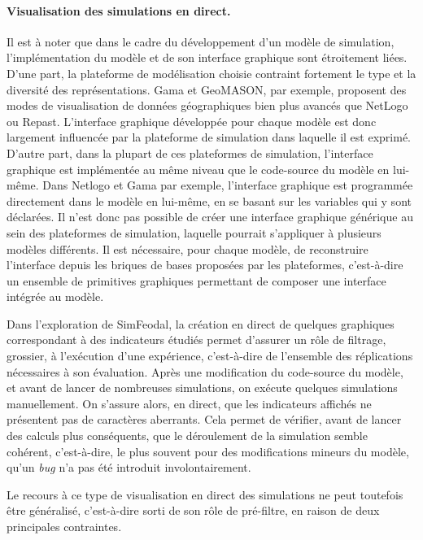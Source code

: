\paragraph{Visualisation des simulations en direct.}

Il est à noter que dans le cadre du développement d'un modèle de simulation, l'implémentation du modèle et de son interface graphique sont étroitement liées.
D'une part, la plateforme de modélisation choisie contraint fortement le type et la diversité des représentations.
Gama et GeoMASON, par exemple, proposent des modes de visualisation de données géographiques bien plus avancés que NetLogo ou Repast.
L'interface graphique développée pour chaque modèle est donc largement influencée par la plateforme de simulation dans laquelle il est exprimé.
D'autre part, dans la plupart de ces plateformes de simulation, l'interface graphique est implémentée au même niveau que le code-source du modèle en lui-même.
Dans Netlogo et Gama par exemple, l'interface graphique est programmée directement dans le modèle en lui-même, en se basant sur les variables qui y sont déclarées.
Il n'est donc pas possible de créer une interface graphique générique au sein des plateformes de simulation, laquelle pourrait s'appliquer à plusieurs modèles différents.
Il est nécessaire, pour chaque modèle, de reconstruire l'interface depuis les briques de bases proposées par les plateformes, c'est-à-dire un ensemble de primitives graphiques permettant de composer une interface intégrée au modèle.

Dans l'exploration de SimFeodal, la création en direct de quelques graphiques correspondant à des indicateurs étudiés permet d'assurer un rôle de filtrage, grossier, à l'exécution d'une expérience, c'est-à-dire de l'ensemble des réplications nécessaires à son évaluation.
Après une modification du code-source du modèle, et avant de lancer de nombreuses simulations, on exécute quelques simulations \og manuellement\fg{}.
On s'assure alors, en direct, que les indicateurs affichés ne présentent pas de caractères aberrants.
Cela permet de vérifier, avant de lancer des calculs plus conséquents, que le déroulement de la simulation semble cohérent, c'est-à-dire, le plus souvent pour des modifications mineurs du modèle,  qu'un \textit{bug} n'a pas été introduit involontairement.

Le recours à ce type de visualisation en direct des simulations ne peut toutefois être généralisé, c'est-à-dire sorti de son rôle de pré-filtre, en raison de deux principales contraintes.

